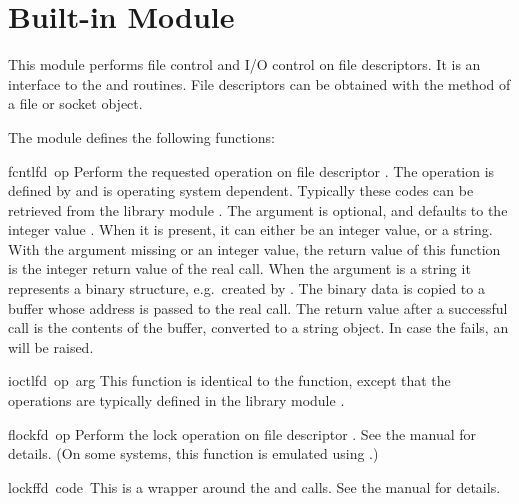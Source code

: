 \section{Built-in Module }

This module performs file control and I/O control on file descriptors.
It is an interface to the  and  \UNIX{} routines.
File descriptors can be obtained with the  method of a
file or socket object.

The module defines the following functions:

\renewcommand{\indexsubitem}{(in module struct)}

\begin{funcdesc}{fcntl}{fd\, op}
  Perform the requested operation on file descriptor .
  The operation is defined by  and is operating system
  dependent.  Typically these codes can be retrieved from the library
  module . The argument  is optional, and
  defaults to the integer value .  When
  it is present, it can either be an integer value, or a string.  With
  the argument missing or an integer value, the return value of this
  function is the integer return value of the real 
  call.  When the argument is a string it represents a binary
  structure, e.g.\ created by . The binary data is
  copied to a buffer whose address is passed to the real 
  call.  The return value after a successful call is the contents of
  the buffer, converted to a string object.  In case the
   fails, an  will be raised.
\end{funcdesc}

\begin{funcdesc}{ioctl}{fd\, op\, arg}
  This function is identical to the  function, except
  that the operations are typically defined in the library module
  .
\end{funcdesc}

\begin{funcdesc}{flock}{fd\, op}
Perform the lock operation  on file descriptor .
See the \UNIX{} manual for details.  (On some systems, this function is
emulated using .)
\end{funcdesc}

\begin{funcdesc}{lockf}{fd\, code\, }
This is a wrapper around the  and 
 calls.  See the \UNIX{} manual for details.
\end{funcdesc}

